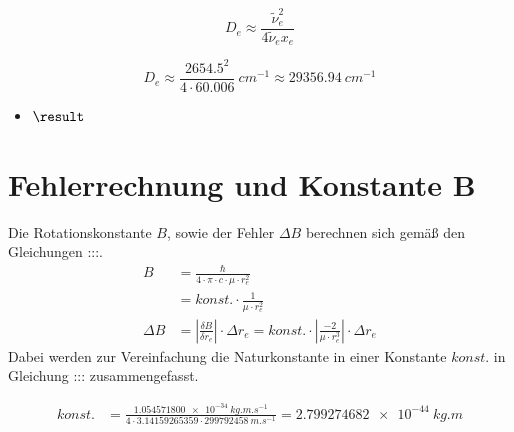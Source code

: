 \begin{equation} 
	\label{eq:de}
		D_e \approx \frac{\tilde{\nu}_e^2}{4 \tilde{\nu}_e x_e}
\end{equation}

\begin{equation} 
	\label{eq:de}
		D_e \approx \frac{2654.5^2}{4\cdot60.006} ~\si
{cm^{-1}}  \approx  \SI[mode=math]{29356.94}{cm^{-1}} 
\end{equation}

\begin{itemize}
 \item {}%
    $\result$
\end{itemize} 
\section{Fehlerrechnung und Konstante B}
Die Rotationskonstante $B$, sowie der Fehler $\Delta B$ berechnen sich gemäß den Gleichungen :::.
\begin{align}
\label{eq:B}
B 	
   			&= \frac{\hbar}{4 \cdot \pi \cdot c \cdot \mu  \cdot r_e^{2}}
   			\\
   			&= konst.\cdot\frac{1}{\mu  \cdot r_e^{2}}
   			\\
\Delta B	
   			&=  \left|\frac{\delta B}{\delta r_e}\right|\cdot\Delta r_e =konst. \cdot\left|\frac{-2}{\mu \cdot r_e^{3}  }\right|\cdot \Delta r_e   			 
\end{align}
Dabei werden zur Vereinfachung die Naturkonstante in einer Konstante $konst.$ in Gleichung ::: zusammengefasst.


\begin{align}
\label{eq:konst}
konst.&= 			 \frac{\SI[mode=math]{1.054571800e-34}{kg.m.s^{-1}}}{4\cdot 3.14159265359 \cdot \SI[mode=math]{299792458}{m.s^{-1}}}=\SI[mode=math]{2.799274682e-44}{kg.m}  				
\end{align}

